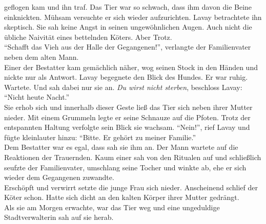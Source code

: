 geflogen kam und ihn traf. Das Tier war so schwach, dass ihm davon die Beine einknickten. Mühsam 
versuchte er sich wieder aufzurichten. Lavay betrachtete ihn skeptisch. Sie sah keine Angst in 
seinen ungewöhnlichen Augen. Auch nicht die übliche Naivität eines bettelnden Köters. Aber 
Trotz.\\
``Schafft das Vieh aus der Halle der Gegangenen!'', verlangte der Familienvater neben dem alten 
Mann.\\
Einer der Bestatter kam gemächlich näher, wog seinen Stock in den Händen und nickte nur als 
Antwort. Lavay begegnete den Blick des Hundes. Er war ruhig. Wartete. Und sah dabei nur sie an.
\textit{Du wirst nicht sterben}, beschloss Lavay: ``Nicht heute Nacht.''\\
Sie erhob sich und innerhalb dieser Geste ließ das Tier sich neben ihrer Mutter nieder. Mit einem 
Grummeln legte er seine Schnauze auf die Pfoten. Trotz der entspannten Haltung verfolgte sein Blick 
sie wachsam. ``Nein!'', rief Lavay und fügte kleinlauter hinzu: ``Bitte. Er gehört zu meiner 
Familie.''\\
Dem Bestatter war es egal, dass sah sie ihm an. Der Mann wartete auf die Reaktionen der Trauernden. 
Kaum einer sah von den Ritualen auf und schließlich seufzte der Familienvater, umschlang seine 
Tocher und winkte ab, ehe er sich wieder dem Gegangenen zuwandte.\\
Erschöpft und verwirrt setzte die junge Frau sich nieder. Anscheinend schlief der Köter schon. 
Hatte sich dicht an den kalten Körper ihrer Mutter gedrängt.\\
Als sie am Morgen erwachte, war das Tier weg und eine ungeduldige Stadtverwalterin sah auf sie 
herab.\\


